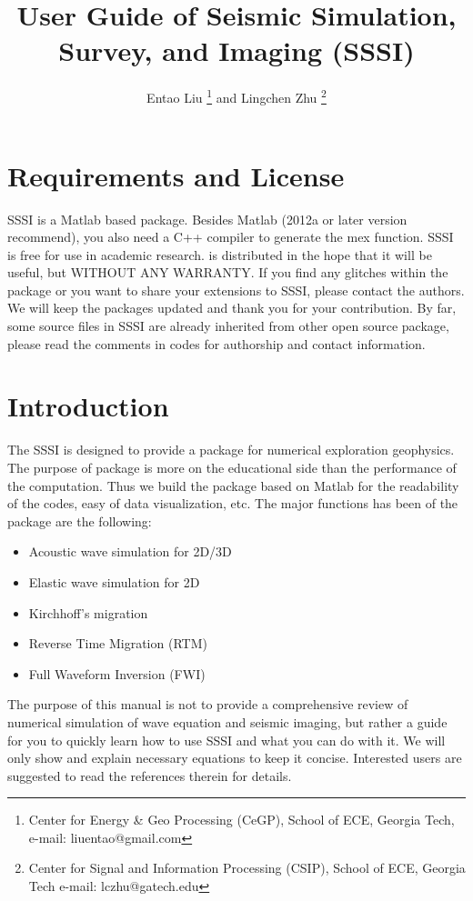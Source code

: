\documentclass[11pt]{article}
\theoremstyle{plain}
\theoremstyle{definition}
\theoremstyle{remark}
\numberwithin{equation}{section}
\begin{document}
\title{User Guide of Seismic Simulation, Survey, and Imaging (SSSI)}
\author{Entao Liu \thanks{Center for Energy \& Geo Processing (CeGP), School of ECE, Georgia Tech, e-mail: liuentao@gmail.com}
and Lingchen Zhu \thanks{Center for Signal and Information Processing (CSIP), School of ECE, Georgia Tech 
e-mail: lczhu@gatech.edu}} \maketitle

\section{Requirements and License}

SSSI is a Matlab based package. Besides Matlab (2012a or later version recommend), you also need a C++ compiler to generate the mex function. 
SSSI is free for use in academic research. is distributed in the hope that it will be useful, but WITHOUT ANY
WARRANTY. If you find any glitches within the package or you want to share your extensions to SSSI, please contact the authors. We will keep the packages updated and thank you for your contribution. By far, some source files in SSSI are already inherited from other open source package, please read the comments in codes for authorship and contact information. 

\section{Introduction}
The SSSI is designed to provide a package for numerical exploration geophysics. The purpose of package is more on the educational side than the performance of the computation. Thus we build the package based on Matlab for the readability of the codes, easy of data visualization, etc. The major functions has been of the package are the following:
\begin{itemize}
\item Acoustic wave simulation for 2D/3D
\item Elastic wave simulation for 2D
\item Kirchhoff's migration
\item Reverse Time Migration (RTM)
\item Full Waveform Inversion (FWI)
\end{itemize}
The purpose of this manual is not to provide a comprehensive review of numerical simulation of wave equation and seismic imaging, but rather a guide for you to quickly learn how to use SSSI and what you can do with it. We will only show and explain necessary equations to keep it concise.
Interested users are suggested to read the references therein for details.  
\end{document}

